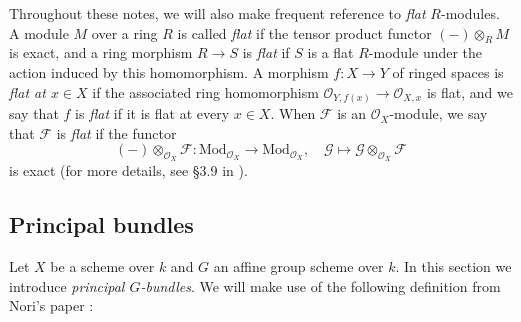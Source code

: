 \documentclass[10pt]{amsart}
\numberwithin{equation}{section}
\def\~#1{\mathscr{#1}}
\newcommand{\Mod}{\mathrm{Mod}}
\theoremstyle{plain}
\theoremstyle{definition}
\theoremstyle{remark}
\begin{document}
Throughout these notes, we will also make frequent reference to \emph{flat} $R$-modules. A module  $M$ over a ring $R$ is called \emph{flat} if the tensor product functor $(-)\otimes_R M$ is exact, and a ring morphism $R \to S$ is \emph{flat} if $S$ is a flat $R$-module under the action induced by this homomorphism. A morphism $f: X \to Y$ of ringed spaces is \emph{flat at $x \in X$} if the associated ring homomorphism $\~O_{Y, f(x)} \to \~O_{X, x}$ is flat, and we say that $f$ is \emph{flat} if it is flat at every $x \in X$. When $\~F$ is an $\~O_X$-module, we say that $\~F$ is \emph{flat} if the functor 
\[
   (-)\otimes_{\~O_X}\~F: \Mod_{\~O_X} \to \Mod_{\~O_X}, \quad \~G \mapsto \~G \otimes_{\~O_X} \~F
\]
is exact (for more details, see \S3.9 in \cite{hartshorne}). 
\subsection{Principal bundles}
Let $X$ be a scheme over $k$ and $G$ an affine group scheme over $k$. In this section we introduce \emph{principal $G$-bundles}. We will make use of the following definition from Nori's paper \cite{nori76}:
\end{document}
